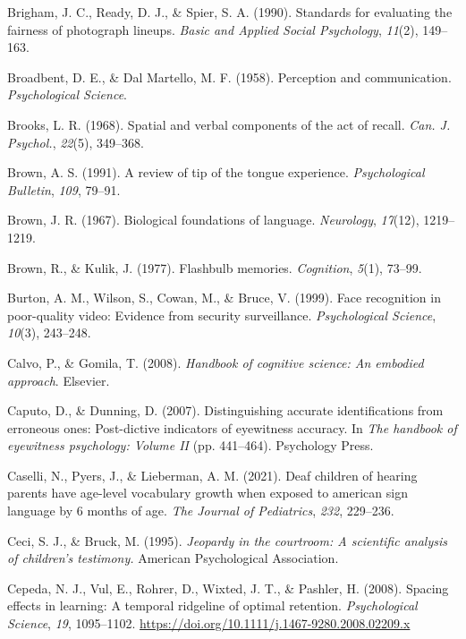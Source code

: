 \documentclass[
]{krantz}
\newlength{\cslhangindent}
\newenvironment{CSLReferences}[2] %
 {\begin{list}{}{%
  \setlength{\itemindent}{0pt}
  \setlength{\leftmargin}{0pt}
  \setlength{\parsep}{0pt}
  \ifodd #1
   \setlength{\leftmargin}{\cslhangindent}
   \setlength{\itemindent}{-1\cslhangindent}
  \fi
  \setlength{\itemsep}{#2\baselineskip}}}
 {\end{list}}
\begin{document}
\begin{CSLReferences}{1}{0}
Brigham, J. C., Ready, D. J., \& Spier, S. A. (1990). Standards for evaluating the fairness of photograph lineups. \emph{Basic and Applied Social Psychology}, \emph{11}(2), 149--163.

Broadbent, D. E., \& Dal Martello, M. F. (1958). Perception and communication. \emph{Psychological Science}.

Brooks, L. R. (1968). Spatial and verbal components of the act of recall. \emph{Can. J. Psychol.}, \emph{22}(5), 349--368.

Brown, A. S. (1991). A review of tip of the tongue experience. \emph{Psychological Bulletin}, \emph{109}, 79--91.

Brown, J. R. (1967). Biological foundations of language. \emph{Neurology}, \emph{17}(12), 1219--1219.

Brown, R., \& Kulik, J. (1977). Flashbulb memories. \emph{Cognition}, \emph{5}(1), 73--99.

Burton, A. M., Wilson, S., Cowan, M., \& Bruce, V. (1999). Face recognition in poor-quality video: Evidence from security surveillance. \emph{Psychological Science}, \emph{10}(3), 243--248.

Calvo, P., \& Gomila, T. (2008). \emph{Handbook of cognitive science: An embodied approach}. Elsevier.

Caputo, D., \& Dunning, D. (2007). Distinguishing accurate identifications from erroneous ones: Post-dictive indicators of eyewitness accuracy. In \emph{The handbook of eyewitness psychology: Volume II} (pp. 441--464). Psychology Press.

Caselli, N., Pyers, J., \& Lieberman, A. M. (2021). Deaf children of hearing parents have age-level vocabulary growth when exposed to american sign language by 6 months of age. \emph{The Journal of Pediatrics}, \emph{232}, 229--236.

Ceci, S. J., \& Bruck, M. (1995). \emph{Jeopardy in the courtroom: A scientific analysis of children's testimony.} American Psychological Association.

Cepeda, N. J., Vul, E., Rohrer, D., Wixted, J. T., \& Pashler, H. (2008). Spacing effects in learning: A temporal ridgeline of optimal retention. \emph{Psychological Science}, \emph{19}, 1095--1102. \url{https://doi.org/10.1111/j.1467-9280.2008.02209.x}


\end{CSLReferences}
\end{document}

